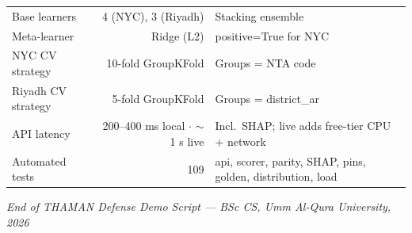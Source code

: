 \documentclass[11pt, a4paper, twoside]{article}
\begin{document}
\begin{table}[H]
\begin{tabular}{lrl}
    Base learners           & 4 (NYC), 3 (Riyadh) & Stacking ensemble \\
    Meta-learner            & Ridge (L2) & positive=True for NYC \\
    NYC CV strategy         & 10-fold GroupKFold & Groups = NTA code \\
    Riyadh CV strategy      & 5-fold GroupKFold  & Groups = district\_ar \\
    API latency             & 200--400 ms local $\cdot$ $\sim$1 s live & Incl.\ SHAP; live adds free-tier CPU + network \\
    Automated tests         & 109         & api, scorer, parity, SHAP, pins, golden, distribution, load \\
    \bottomrule
  \end{tabular}
\end{table}

\vfill
\begin{center}
  {\small\textit{End of THAMAN Defense Demo Script --- BSc CS, Umm Al-Qura University, 2026}}
\end{center}
\end{document}
